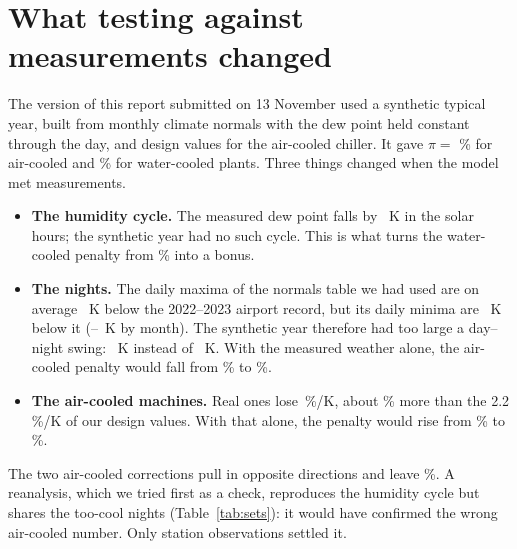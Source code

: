 \documentclass[10pt,a4paper]{article}
\begin{document}
\section{What testing against measurements changed}\label{sec:changed}
The version of this report submitted on 13 November used a synthetic typical year, built from monthly climate normals
with the dew point held constant through the day, and design values for the air-cooled chiller. It gave
$\pi=$ \FirstPiAC\% for air-cooled and \FirstPiWC\% for water-cooled plants. Three things changed when the model met
measurements.
\begin{itemize}
\item \textbf{The humidity cycle.} The measured dew point falls by \DTdpAbs~K in the solar hours; the synthetic year
had no such cycle. This is what turns the water-cooled penalty from \FirstPiWC\% into a bonus.
\item \textbf{The nights.} The daily maxima of the normals table we had used are on average \NormTmaxDiff~K below
the 2022--2023 airport record, but its daily minima are \NormTminDiff~K below it (\NormTminDiffLo--\NormTminDiffHi~K
by month). The synthetic year therefore had too large a day--night swing: \FirstDTdb~K instead of \DTdb~K. With the
measured weather alone, the air-cooled penalty would fall from \FirstPiAC\% to \FirstPiACMeasuredWeather\%.
\item \textbf{The air-cooled machines.} Real ones lose \SensAC\,\%/K, about \DesignUnderAC\% more than the 2.2\,\%/K
of our design values. With that alone, the penalty would rise from \FirstPiAC\% to \FirstPiACLibraryChiller\%.
\end{itemize}
The two air-cooled corrections pull in opposite directions and leave \PiAC\%. A reanalysis, which we tried first as a
check, reproduces the humidity cycle but shares the too-cool nights (Table~\ref{tab:sets}): it would have confirmed
the wrong air-cooled number. Only station observations settled it.
\end{document}
